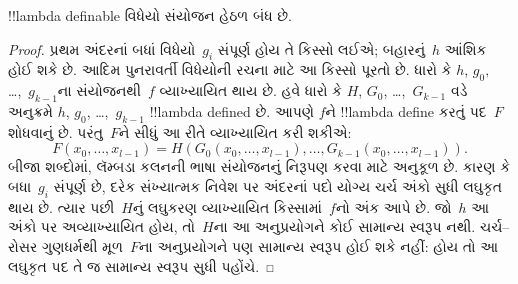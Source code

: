 \documentclass[../../../include/open-logic-section]{subfiles}
\begin{document}

\begin{lem}
!!{lambda definable} વિધેયો સંયોજન હેઠળ બંધ છે.
\end{lem}

\begin{proof}
પ્રથમ અંદરનાં બધાં વિધેયો~$g_i$ સંપૂર્ણ હોય તે કિસ્સો લઈએ;
બહારનું~$h$ આંશિક હોઈ શકે છે. આદિમ પુનરાવર્તી વિધેયોની રચના
માટે આ કિસ્સો પૂરતો છે.
ધારો કે $h$, $g_0,$ \dots,~$g_{k-1}$ના સંયોજનથી~$f$
વ્યાખ્યાયિત થાય છે. હવે ધારો કે $H$, $G_0$, \dots,~$G_{k-1}$ વડે
અનુક્રમે $h$, $g_0$, \dots,~$g_{k-1}$ !!{lambda defined} છે. આપણે
$f$ને !!{lambda define} કરતું પદ~$F$ શોધવાનું છે. પરંતુ~$F$ને
સીધું આ રીતે વ્યાખ્યાયિત કરી શકીએ:
\[
F(x_0, \dots, x_{l-1}) = H(G_0(x_0, \dots, x_{l-1}),
\dots, G_{k-1}(x_0, \dots, x_{l-1})).
\]
બીજા શબ્દોમાં, લૅમ્બડા કલનની ભાષા સંયોજનનું નિરૂપણ કરવા માટે
અનુકૂળ છે.
કારણ કે બધા~$g_i$ સંપૂર્ણ છે, દરેક સંખ્યાત્મક નિવેશ પર અંદરનાં
પદો યોગ્ય ચર્ચ અંકો સુધી લઘુકૃત થાય છે. ત્યાર પછી~$H$નું લઘુકરણ
વ્યાખ્યાયિત કિસ્સામાં~$f$નો અંક આપે છે. જો~$h$ આ અંકો પર
અવ્યાખ્યાયિત હોય, તો~$H$ના આ અનુપ્રયોગને કોઈ સામાન્ય સ્વરૂપ નથી.
ચર્ચ--રોસર ગુણધર્મથી મૂળ~$F$ના અનુપ્રયોગને પણ સામાન્ય સ્વરૂપ હોઈ
શકે નહીં: હોય તો આ લઘુકૃત પદ તે જ સામાન્ય સ્વરૂપ સુધી પહોંચે.
\end{proof}

\end{document}
